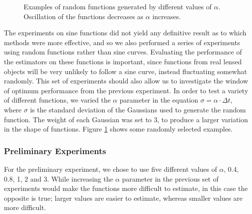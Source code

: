 \documentclass[a4paper,11pt]{article}
\begin{document}
\begin{figure}
   \begin{center}
   \end{center}
   \caption{Examples of random functions generated by different
   values of $\alpha$. Oscillation of the functions decreases as $\alpha$ increases.}
   \label{fig:randex}
   \end{figure}
   The experiments on sine functions did not yield any definitive result as to
   which methods were more effective, and so we also performed a series of
   experiments using random functions rather than sine curves. Evaluating the
   performance of the estimators on these functions is important, since
   functions from real lensed objects will be very unlikely to follow a sine
   curve, instead fluctuating somewhat randomly. This set of experiments should
   also allow us to investigate the window of optimum performance from the
   previous experiment. In order to test a variety of different functions, we
   varied the $\alpha$ parameter in the equation $\sigma=\alpha\cdot\Delta t$,
   where $\sigma$ is the standard deviation of the Gaussians used to generate
   the random function. The weight of each Gaussian was set to 3, to produce a
   larger variation in the shape of functions. Figure \ref{fig:randex} shows
   some randomly selected examples.
\subsubsection{Preliminary Experiments}
\label{sec-8-2-1}

    For the preliminary experiment, we chose to use five different values of
    $\alpha$, 0.4, 0.8, 1, 2 and 3. While increasing the $\alpha$ parameter in the
    previous set of experiments would make the functions more difficult to estimate,
    in this case the opposite is true; larger values are easier to estimate, whereas
    smaller values are more difficult.
    
\end{document}
